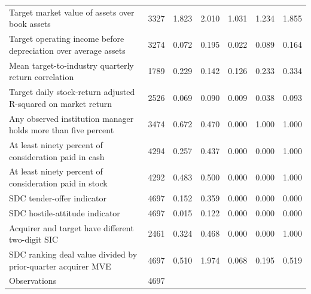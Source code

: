 {\begin{tabular}{l*{1}{cccccc}}
Target market value of assets over book assets&        3327&       1.823&       2.010&       1.031&       1.234&       1.855\\
Target operating income before depreciation over average assets&        3274&       0.072&       0.195&       0.022&       0.089&       0.164\\
Mean target-to-industry quarterly return correlation&        1789&       0.229&       0.142&       0.126&       0.233&       0.334\\
Target daily stock-return adjusted R-squared on market return&        2526&       0.069&       0.090&       0.009&       0.038&       0.093\\
Any observed institution manager holds more than five percent&        3474&       0.672&       0.470&       0.000&       1.000&       1.000\\
At least ninety percent of consideration paid in cash&        4294&       0.257&       0.437&       0.000&       0.000&       1.000\\
At least ninety percent of consideration paid in stock&        4292&       0.483&       0.500&       0.000&       0.000&       1.000\\
SDC tender-offer indicator&        4697&       0.152&       0.359&       0.000&       0.000&       0.000\\
SDC hostile-attitude indicator&        4697&       0.015&       0.122&       0.000&       0.000&       0.000\\
Acquirer and target have different two-digit SIC&        2461&       0.324&       0.468&       0.000&       0.000&       1.000\\
SDC ranking deal value divided by prior-quarter acquirer MVE&        4697&       0.510&       1.974&       0.068&       0.195&       0.519\\
\hline
Observations        &        4697&            &            &            &            &            \\
\hline\hline
\end{tabular}
}
